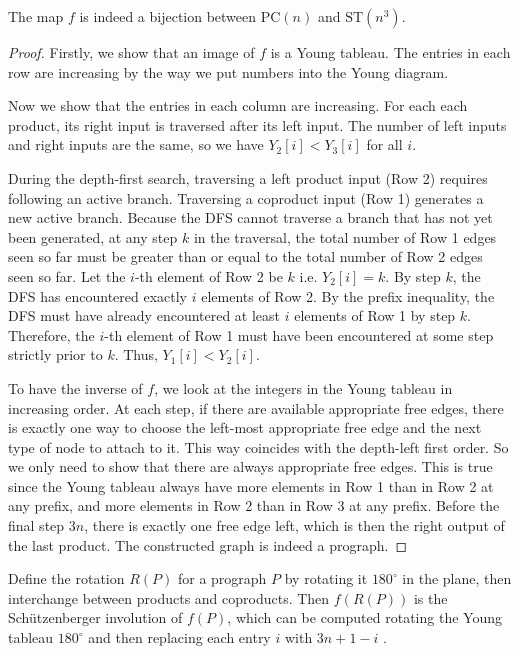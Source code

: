 \begin{proposition}
  The map $f$ is indeed a bijection between $\text{PC}(n)$ and $\text{ST}(n^3)$.
\end{proposition}
\begin{proof}
  Firstly, we show that an image of $f$ is a Young tableau. The entries in each row are increasing by the way we put numbers into the Young diagram.

  Now we show that the entries in each column are increasing. For each each product, its right input is traversed after its left input. The number of left inputs and right inputs are the same, so we have $Y_2[i] < Y_3[i]$ for all $i$.

  During the depth-first search, traversing a left product input (Row 2) requires following an active branch. Traversing a coproduct input (Row 1) generates a new active branch. Because the DFS cannot traverse a branch that has not yet been generated, at any step $k$ in the traversal, the total number of Row 1 edges seen so far must be greater than or equal to the total number of Row 2 edges seen so far. Let the $i$-th element of Row 2 be $k$ i.e. $Y_2[i] = k$. By step $k$, the DFS has encountered exactly $i$ elements of Row 2. By the prefix inequality, the DFS must have already encountered at least $i$ elements of Row 1 by step $k$. Therefore, the $i$-th element of Row 1 must have been encountered at some step strictly prior to $k$. Thus, $Y_1[i] < Y_2[i]$.

  To have the inverse of $f$, we look at the integers in the Young tableau in increasing order. At each step, if there are available appropriate free edges, there is exactly one way to choose the left-most appropriate free edge and the next type of node to attach to it. This way coincides with the depth-left first order. So we only need to show that there are always appropriate free edges. This is true since the Young tableau always have more elements in Row 1 than in Row 2 at any prefix, and more elements in Row 2 than in Row 3 at any prefix. Before the final step $3n$, there is exactly one free edge left, which is then the right output of the last product. The constructed graph is indeed a prograph.
\end{proof}

Define the rotation $R(P)$ for a prograph $P$ by rotating it $180^\circ$ in the plane, then interchange between products and coproducts. Then $f(R(P))$ is the Schützenberger involution of $f(P)$, which can be computed rotating the Young tableau $180^\circ$ and then replacing each entry $i$ with $3n+1-i$ \cite{borie2017three}.

